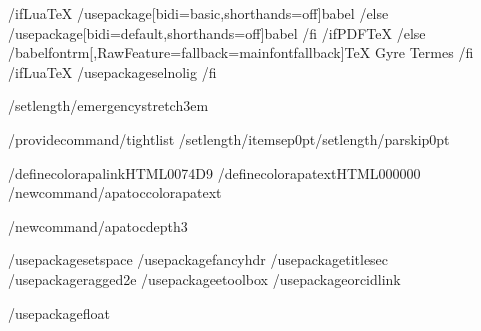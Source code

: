 /ifLuaTeX
/usepackage[bidi=basic,shorthands=off]{babel}
/else
/usepackage[bidi=default,shorthands=off]{babel}
/fi
/ifPDFTeX
/else
/babelfont{rm}[,RawFeature={fallback=mainfontfallback}]{TeX Gyre Termes}
/fi
/ifLuaTeX
  /usepackage{selnolig} %
/fi


/setlength{/emergencystretch}{3em} %

/providecommand{/tightlist}{%
  /setlength{/itemsep}{0pt}/setlength{/parskip}{0pt}}






%

/definecolor{apalink}{HTML}{0074D9}
/definecolor{apatext}{HTML}{000000}
/newcommand{/apatoccolor}{apatext}

/newcommand{/apatocdepth}{3}

/usepackage{setspace}
/usepackage{fancyhdr}
/usepackage{titlesec}
/usepackage{ragged2e}
/usepackage{etoolbox}
/usepackage{orcidlink}

/usepackage{float}

